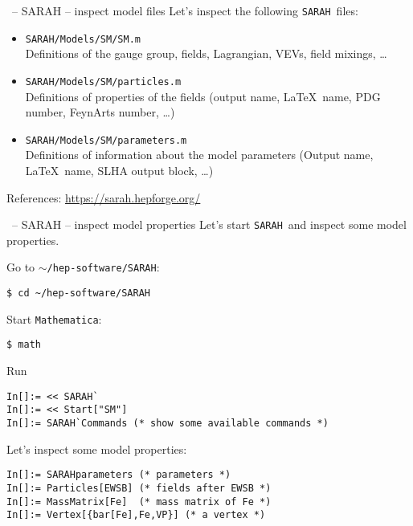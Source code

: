 \documentclass[11pt]{beamer}
\newcommand{\Mathematica}{\texttt{Mathematica}}
\newcommand{\SARAH}{\texttt{SARAH}}
\begin{document}

\begin{frame}[fragile]{\insertsection\ -- SARAH -- inspect model files}
  Let's inspect the following \SARAH\ files:
  \begin{itemize}
  \item \texttt{SARAH/Models/SM/SM.m}\\ Definitions of the gauge
    group, fields, Lagrangian, VEVs, field mixings, \ldots
  \item \texttt{SARAH/Models/SM/particles.m}\\
    Definitions of properties of the fields (output name, \LaTeX\
    name, PDG number, FeynArts number, \ldots)
  \item \texttt{SARAH/Models/SM/parameters.m}\\
    Definitions of information about the model parameters (Output
    name, \LaTeX\ name, SLHA output block, \ldots)
  \end{itemize}
  \bigskip

  References: \url{https://sarah.hepforge.org/}
\end{frame}


\begin{frame}[fragile]{\insertsection\ -- SARAH -- inspect model properties}
  Let's start \SARAH\ and inspect some model properties.
  
  Go to \texttt{$\sim$/hep-software/SARAH}:
  \begin{lstlisting}
$ cd ~/hep-software/SARAH\end{lstlisting}%
  Start \Mathematica:
  \begin{lstlisting}
$ math\end{lstlisting}%
  Run
  \begin{lstlisting}
In[]:= << SARAH`
In[]:= << Start["SM"]
In[]:= SARAH`Commands (* show some available commands *)\end{lstlisting}
  Let's inspect some model properties:
  \begin{lstlisting}
In[]:= SARAHparameters (* parameters *)
In[]:= Particles[EWSB] (* fields after EWSB *)
In[]:= MassMatrix[Fe]  (* mass matrix of Fe *)
In[]:= Vertex[{bar[Fe],Fe,VP}] (* a vertex *)\end{lstlisting}
\end{frame}

\end{document}
